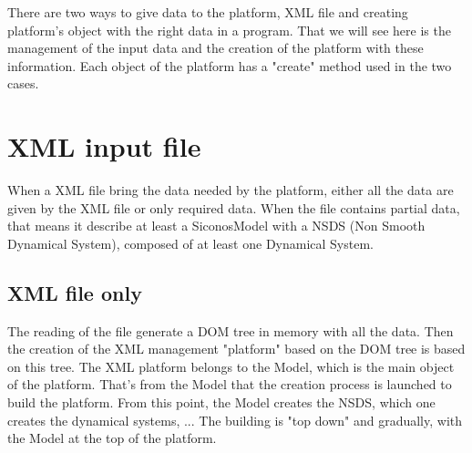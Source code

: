 There are two ways to give data to the platform, XML file and creating platform's object with
the right data in a program. That we will see here is the management of the input data and the
creation of the platform with these information.
Each object of the platform has a "create" method used in the two cases.

\section{XML input file}
When a XML file bring the data needed by the platform, either all the data are given by the XML
file or only required data. When the file contains partial data, that means it describe at least
a SiconosModel with a NSDS (Non Smooth Dynamical System), composed of at least one Dynamical
System.
\subsection{XML file only}
The reading of the file generate a DOM tree in memory with all the data. Then the creation of the XML management "platform" based on
the DOM tree is based on this tree.
The XML platform belongs to the Model, which is the main object of the platform. That's from the
Model that the creation process is launched to build the platform.
From this point, the Model creates the NSDS, which one creates the dynamical systems, ... The
building is "top down" and gradually, with the Model at the top of the platform. 
